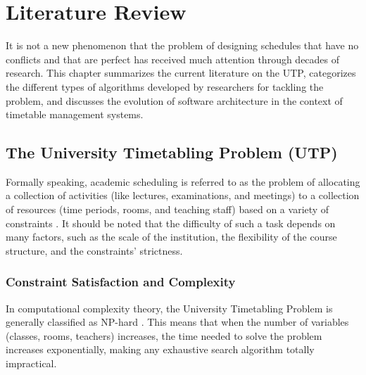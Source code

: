 
\chapter{Literature Review} %

\label{Chapter2} %


It is not a new phenomenon that the problem of designing schedules that have no conflicts and that are perfect has received much attention through decades of research. This chapter summarizes the current literature on the UTP, categorizes the different types of algorithms developed by researchers for tackling the problem, and discusses the evolution of software architecture in the context of timetable management systems.

\section{The University Timetabling Problem (UTP)}

Formally speaking, academic scheduling is referred to as the problem of allocating a collection of activities (like lectures, examinations, and meetings) to a collection of resources (time periods, rooms, and teaching staff) based on a variety of constraints \cite{schaerf1999survey}. It should be noted that the difficulty of such a task depends on many factors, such as the scale of the institution, the flexibility of the course structure, and the constraints' strictness.

\subsection{Constraint Satisfaction and Complexity}
In computational complexity theory, the University Timetabling Problem is generally classified as NP-hard \cite{even1975complexity}. This means that when the number of variables (classes, rooms, teachers) increases, the time needed to solve the problem increases exponentially, making any exhaustive search algorithm totally impractical.

